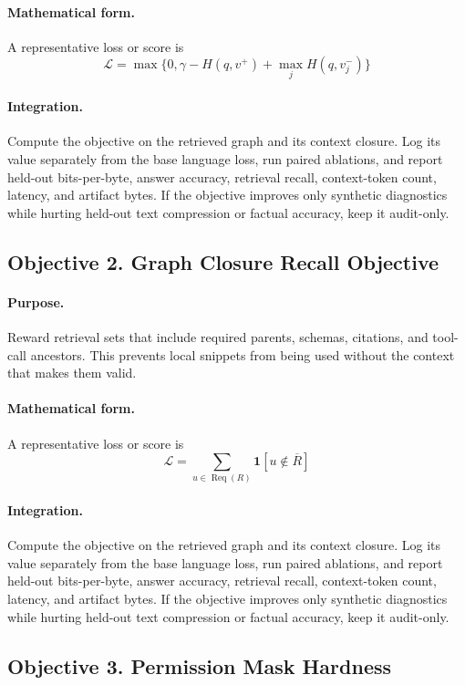 \documentclass[11pt]{article}
\theoremstyle{definition}
\theoremstyle{remark}
\begin{document}
\paragraph{Mathematical form.} A representative loss or score is
\[
    \mathcal L=\max\{0,\gamma-H(q,v^+)+\max_jH(q,v^-_j)\}
\]

\paragraph{Integration.} Compute the objective on the retrieved graph and its context closure. Log its value separately from the base language loss, run paired ablations, and report held-out bits-per-byte, answer accuracy, retrieval recall, context-token count, latency, and artifact bytes. If the objective improves only synthetic diagnostics while hurting held-out text compression or factual accuracy, keep it audit-only.


\subsection{Objective 2. Graph Closure Recall Objective}
\paragraph{Purpose.} Reward retrieval sets that include required parents, schemas, citations, and tool-call ancestors. This prevents local snippets from being used without the context that makes them valid.

\paragraph{Mathematical form.} A representative loss or score is
\[
    \mathcal L=\sum_{u\in \operatorname{Req}(R)}\mathbf 1[u\notin \overline R]
\]

\paragraph{Integration.} Compute the objective on the retrieved graph and its context closure. Log its value separately from the base language loss, run paired ablations, and report held-out bits-per-byte, answer accuracy, retrieval recall, context-token count, latency, and artifact bytes. If the objective improves only synthetic diagnostics while hurting held-out text compression or factual accuracy, keep it audit-only.


\subsection{Objective 3. Permission Mask Hardness}
\end{document}
